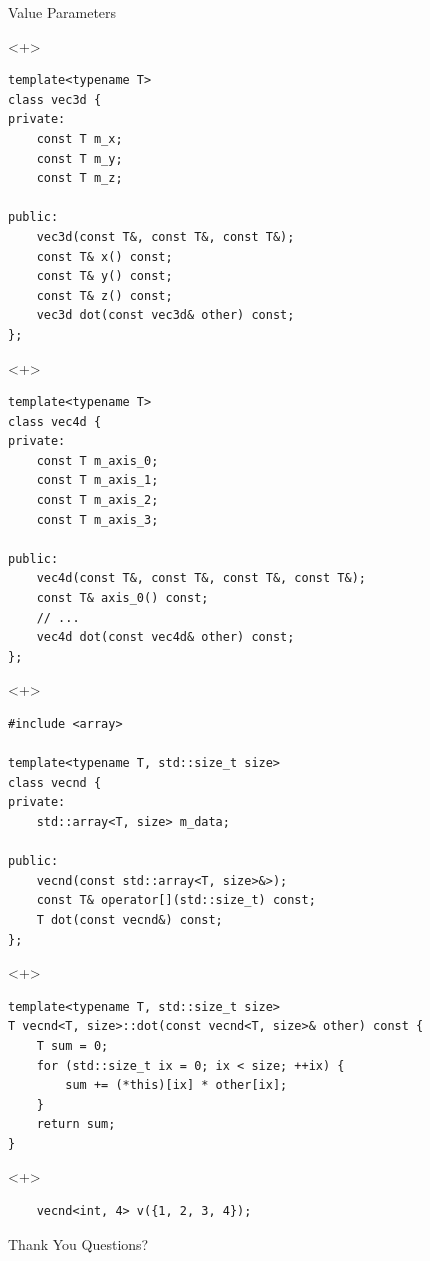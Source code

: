 \documentclass[table]{beamer}
\begin{document}
\begin{frame}[fragile]{Value Parameters}
  \begin{onlyenv}<+>
    \begin{verbatim}
template<typename T>
class vec3d {
private:
    const T m_x;
    const T m_y;
    const T m_z;

public:
    vec3d(const T&, const T&, const T&);
    const T& x() const;
    const T& y() const;
    const T& z() const;
    vec3d dot(const vec3d& other) const;
};
    \end{verbatim}
  \end{onlyenv}

  \begin{onlyenv}<+>
    \begin{verbatim}
template<typename T>
class vec4d {
private:
    const T m_axis_0;
    const T m_axis_1;
    const T m_axis_2;
    const T m_axis_3;

public:
    vec4d(const T&, const T&, const T&, const T&);
    const T& axis_0() const;
    // ...
    vec4d dot(const vec4d& other) const;
};
    \end{verbatim}
  \end{onlyenv}

  \begin{onlyenv}<+>
    \begin{verbatim}
#include <array>

template<typename T, std::size_t size>
class vecnd {
private:
    std::array<T, size> m_data;

public:
    vecnd(const std::array<T, size>&>);
    const T& operator[](std::size_t) const;
    T dot(const vecnd&) const;
};
    \end{verbatim}
  \end{onlyenv}

  \begin{onlyenv}<+>
    \begin{verbatim}
template<typename T, std::size_t size>
T vecnd<T, size>::dot(const vecnd<T, size>& other) const {
    T sum = 0;
    for (std::size_t ix = 0; ix < size; ++ix) {
        sum += (*this)[ix] * other[ix];
    }
    return sum;
}
    \end{verbatim}
  \end{onlyenv}

  \begin{onlyenv}<+>
    \begin{verbatim}
    vecnd<int, 4> v({1, 2, 3, 4});
    \end{verbatim}
  \end{onlyenv}
\end{frame}

\begin{frame}{Thank You}
  Questions?
\end{frame}
\end{document}
